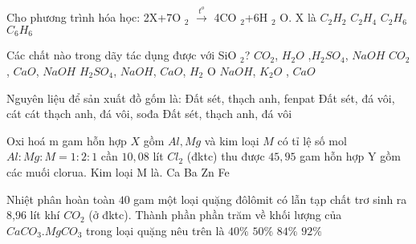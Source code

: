 \begin{ex}
	Cho phương trình hóa học: 2X+7O $_2$ $\stackrel{t^o}{\to}$ 4CO $_2$+6H $_2$ O. X là
	\choice
	{$C_2H_2$}
	{$C_2H_4$}
	{\True $C_2H_6$}
	{$C_6H_6$}
	\loigiai{}
\end{ex}
\begin{ex}
	Các chất nào trong dãy tác dụng được với SiO $_2$?
	\choice
	{$CO_2$, $H_2O$ ,$H_2SO_4$, $NaOH$}
	{$CO_2$, $CaO$, $NaOH$}
	{$H_2SO_4$, $NaOH$, $CaO$,  $H_2$ O}
	{\True $NaOH$,  $K_2O$ , $CaO$}
	\loigiai{}
\end{ex}
\begin{ex}
	Nguyên liệu để sản xuất đồ gốm là:
	\choice
	{\True Đất sét, thạch anh, fenpat}
	{Đất sét, đá vôi, cát}
	{cát thạch anh, đá vôi, sođa}
	{Đất sét, thạch anh, đá vôi}
	\loigiai{}
\end{ex}
\begin{ex}
	Oxi hoá m gam hỗn hợp $X$ gồm $Al, Mg$ và kim loại $M$ có tỉ lệ số mol $Al: Mg: M=1: 2: 1$ cần $10{,}08$ lít  $Cl_2$ (đktc) thu được $45{,}95$ gam hỗn hợp Y gồm các muối clorua. Kim loại M là.
	\choice
	{Ca}
	{Ba}
	{\True Zn}
	{Fe}
	\loigiai{}
\end{ex}
\begin{ex}
	Nhiệt phân hoàn toàn $40$ gam một loại quặng đôlômit có lẫn tạp chất trơ sinh ra 8,96 lít khí $CO_2$ (ở đktc). Thành phần phần trăm về khối lượng của  $CaCO_3.MgCO_3$ trong loại quặng nêu trên là
	\choice
	{$40\%$}
	{$50\%$}
	{$84\%$}
	{\True $92\%$}
	\loigiai{}
\end{ex}



